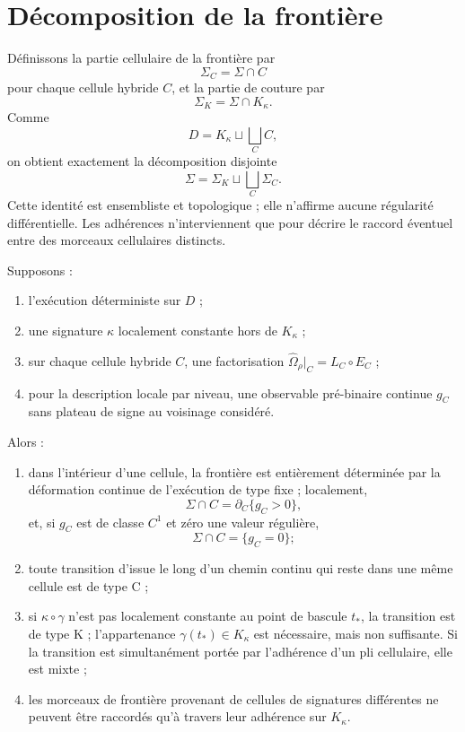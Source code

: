 \section{Décomposition de la frontière}
\label{annexe-J-decomposition}

Définissons la partie cellulaire de la frontière par
\[
\Sigma_C=\Sigma\cap C
\]
pour chaque cellule hybride $C$, et la partie de couture par
\[
\Sigma_K=\Sigma\cap K_\kappa.
\]
Comme
\[
D=K_\kappa\sqcup\bigsqcup_C C,
\]
on obtient exactement la décomposition disjointe
\begin{equation}
\label{eq:annexe-J-decomposition}
\boxed{
\Sigma
=
\Sigma_K\sqcup\bigsqcup_C\Sigma_C.
}
\end{equation}
Cette identité est ensembliste et topologique ; elle n'affirme aucune
régularité différentielle. Les adhérences n'interviennent que pour
décrire le raccord éventuel entre des morceaux cellulaires distincts.

\begin{encadre}[title={Proposition \theproposition{} --- Pli et couture de la frontière}]
Supposons :
\begin{enumerate}
\item l'exécution déterministe sur $D$ ;
\item une signature $\kappa$ localement constante hors de $K_\kappa$ ;
\item sur chaque cellule hybride $C$, une factorisation
$\widehat\Omega_\rho|_C=L_C\circ E_C$ ;
\item pour la description locale par niveau, une observable pré-binaire
continue $g_C$ sans plateau de signe au voisinage considéré.
\end{enumerate}
Alors :
\begin{enumerate}
\item dans l'intérieur d'une cellule, la frontière est entièrement
déterminée par la déformation continue de l'exécution de type fixe ;
localement,
\[
\Sigma\cap C=\partial_C\{g_C>0\},
\]
et, si $g_C$ est de classe $C^1$ et zéro une valeur régulière,
\[
\Sigma\cap C=\{g_C=0\};
\]
\item toute transition d'issue le long d'un chemin continu qui reste dans
une même cellule est de type C ;
\item si $\kappa\circ\gamma$ n'est pas localement constante au point de
bascule $t_*$, la transition est de type K ; l'appartenance
$\gamma(t_*)\in K_\kappa$ est nécessaire, mais non suffisante. Si la
transition est simultanément portée par l'adhérence d'un pli cellulaire,
elle est mixte ;
\item les morceaux de frontière provenant de cellules de signatures
différentes ne peuvent être raccordés qu'à travers leur adhérence sur
$K_\kappa$.
\end{enumerate}
\end{encadre}


